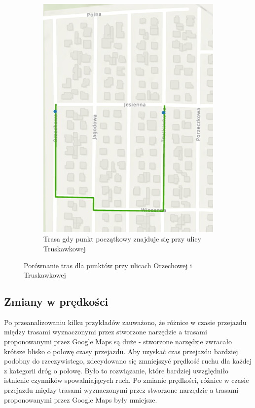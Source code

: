 \documentclass{article}
\begin{document}
\begin{figure}[H]
\begin{subfigure}[b]{0.45\textwidth}
        \includegraphics[width=\textwidth]{img/kierunek-truskawkowa-orzechowa.png}
        \caption{Trasa gdy punkt początkowy znajduje się przy ulicy Truskawkowej}
    \end{subfigure}
    \caption{Porównanie tras dla punktów przy ulicach Orzechowej i Truskawkowej}
\end{figure}

\subsection{Zmiany w prędkości}
Po przeanalizowaniu kilku przykładów zauważono, że różnice w czasie przejazdu między trasami wyznaczonymi przez stworzone narzędzie a trasami proponowanymi przez Google Maps są duże - stworzone narzędzie zwracało krótsze blisko o połowę czasy przejazdu. Aby uzyskać czas przejazdu bardziej podobny do rzeczywistego, zdecydowano się zmniejszyć prędkość ruchu dla każdej z kategorii dróg o połowę. Było to rozwiązanie, które bardziej uwzględniło istnienie czynników spowalniających ruch. Po zmianie prędkości, różnice w czasie przejazdu między trasami wyznaczonymi przez stworzone narzędzie a trasami proponowanymi przez Google Maps były mniejsze.
\end{document}
